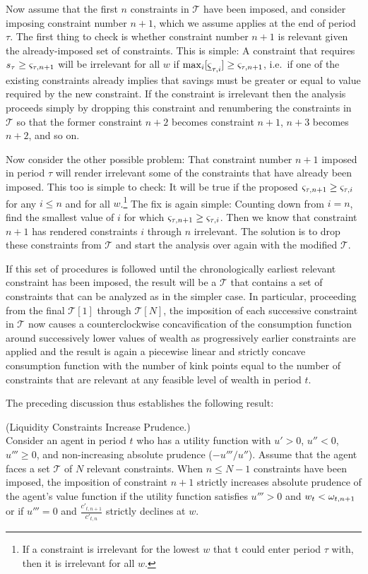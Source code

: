 Now assume that the first $n$ constraints in $\mathcal{T}$ have been imposed, and consider imposing constraint number $n+1$, which we assume applies at the end of period $\tau$.  The first thing to check is whether constraint number $n+1$ is relevant given the already-imposed set of constraints.  This is simple: A constraint that requires $s_{\tau} \geq \varsigma_{\tau,n+1}$ will be irrelevant for all $w$ if $\max_{i} [\underline{\varsigma}_{\tau,i}] \geq \varsigma_{\tau,n+1}$, i.e.\ if one of the existing constraints already implies that savings must be greater or equal to value required by the new constraint.  If the constraint is irrelevant then the analysis proceeds simply by dropping this constraint and renumbering the constraints in $\mathcal{T}$ so that the former constraint $n+2$ becomes constraint $n+1$, $n+3$ becomes $n+2$, and so on.

Now consider the other possible problem: That constraint number $n+1$ imposed in period $\tau$ will render irrelevant some of the constraints that have already been imposed.  This too is simple to check: It will be true if the proposed $\varsigma_{\tau,n+1} \geq \varsigma_{\tau,i}$ for any $i \leq n$ and for all $w$.\footnote{If a constraint is irrelevant for the lowest $w$ that t could enter period $\tau$ with, then it is irrelevant for all $w$.} The fix is again simple: Counting down from $i=n$, find the smallest value of $i$ for which $\varsigma_{\tau,n+1} \geq \varsigma_{\tau,i}$.  Then we know that constraint $n+1$ has rendered constraints $i$ through $n$ irrelevant. The solution is to drop these constraints from $\mathcal{T}$ and start the analysis over again with the modified $\mathcal{T}$.

If this set of procedures is followed until the chronologically earliest relevant constraint has been imposed, the result will be a $\mathcal{T}$ that contains a set of constraints that can be analyzed as in the simpler case. In particular, proceeding from the final $\mathcal{T}[1]$ through $\mathcal{T}[N]$, the imposition of each successive constraint in $\mathcal{T}$ now causes a counterclockwise concavification of the consumption function around successively lower values of wealth as progressively earlier constraints are applied and the result is again a piecewise linear and strictly concave consumption function with the number of kink points equal to the number of constraints that are relevant at any feasible level of wealth in period $t$.

The preceding discussion thus establishes the following result:
\begin{theorem}\label{thm:lcip2} (Liquidity Constraints Increase Prudence.) \\
	Consider an agent in period $t$ who has a utility function with $u' > 0$, $u'' < 0$, $u''' \geq 0$, and non-increasing absolute prudence ($-u'''/u''$). Assume that the agent faces a set $\mathcal{T}$ of $N$ relevant constraints. When $n \leq N-1$ constraints have been imposed, the imposition of constraint $n+1$ strictly increases absolute prudence of the agent's value function if the utility function satisfies $u''' > 0$ and $w_t < \omega_{t,n+1}$ or if $u''' = 0$ and $\frac{c'_{t,n+1}}{c'_{t,n}}$ strictly declines at $w$.
\end{theorem}


